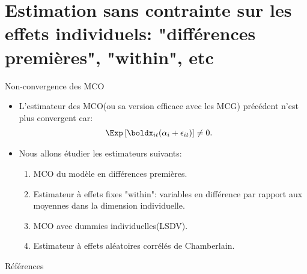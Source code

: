 \section{Estimation sans contrainte sur les effets individuels: "différences premières", "within", etc}
\frame{\sectionpage}
\begin{frame}[allowframebreaks]{Non-convergence des MCO}
    \begin{itemize}
        \item L'estimateur des MCO(ou sa version efficace avec les MCG) précédent n'est plus convergent 
        car:
        \begin{align*}
            \Exp\left[\boldx_{it}(\alpha_i + \epsilon_{it})\right]& \neq 0.
        \end{align*}
        \item Nous allons étudier les estimateurs suivants:
        \begin{enumerate}[$\star$]
            \item MCO du modèle en différences premières.
            \item Estimateur à effets fixes "within": variables en différence par rapport aux moyennes dans la dimension individuelle.
            \item MCO avec dummies individuelles(LSDV).
            \item Estimateur à effets aléatoires corrélés de Chamberlain.
            \end{enumerate}
    \end{itemize}
\end{frame}


\begin{frame}[allowframebreaks]{Références}
 
  
   \end{frame}

    
    